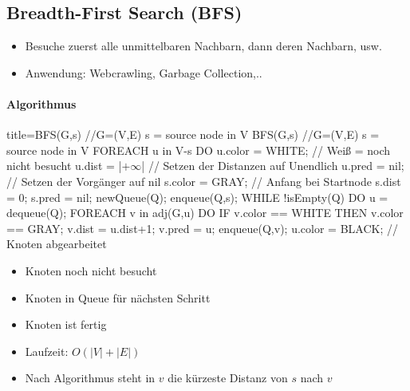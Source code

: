 \documentclass[
    ngerman,
    color=3b,
    dark_mode,
    load_common, %
    summary,
    boxarc,
]{tuda_summary}
\begin{document}
\subsection{Breadth-First Search (BFS)}
\begin{idea}\mbox{}
    \begin{itemize}
        \item Besuche zuerst alle unmittelbaren Nachbarn, dann deren Nachbarn, usw.
        \item Anwendung: Webcrawling, Garbage Collection,..
    \end{itemize}
\end{idea}

\paragraph{Algorithmus}\mbox{}
\begin{codeBlock}[autogobble,escapeinside=||]{title={BFS(G,s) //G=(V,E) s = source node in V}}
    BFS(G,s) //G=(V,E) s = source node in V
    FOREACH u in V-{s} DO
        u.color = WHITE;        // Weiß = noch nicht besucht
        u.dist = |$+\infty$|            // Setzen der Distanzen auf Unendlich
        u.pred = nil;           // Setzen der Vorgänger auf nil
    s.color = GRAY;             // Anfang bei Startnode
    s.dist = 0;
    s.pred = nil;
    newQueue(Q);
    enqueue(Q,s);
    WHILE !isEmpty(Q) DO
        u = dequeue(Q); 
        FOREACH v in adj(G,u) DO
            IF v.color == WHITE THEN
                v.color == GRAY;
                v.dist = u.dist+1;
                v.pred = u;
                enqueue(Q,v);
        u.color = BLACK;            // Knoten abgearbeitet
\end{codeBlock}
\begin{tcolorbox}[
        colback=yellow!20,
        colframe=black!50!red!100,
        enhanced,
        title={Farben:}
    ]
    \begin{itemize}
        \item { Knoten noch nicht besucht}
        \item { Knoten in Queue für nächsten Schritt}
        \item { Knoten ist fertig}
    \end{itemize}
\end{tcolorbox}
\begin{itemize}
    \item Laufzeit: $O(|V| + |E|)$
    \item Nach Algorithmus steht in $v$ die kürzeste Distanz von $s$ nach $v$
\end{itemize}
\end{document}
